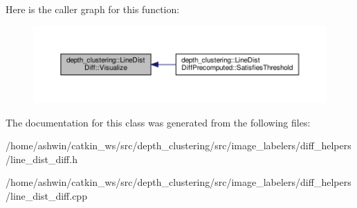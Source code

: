 Here is the caller graph for this function\+:\nopagebreak
\begin{figure}[H]
\begin{center}
\leavevmode
\includegraphics[width=350pt]{classdepth__clustering_1_1LineDistDiff_a7feaf820589ccfb47786d5124a74d725_icgraph}
\end{center}
\end{figure}


The documentation for this class was generated from the following files\+:\begin{DoxyCompactItemize}
\item 
/home/ashwin/catkin\+\_\+ws/src/depth\+\_\+clustering/src/image\+\_\+labelers/diff\+\_\+helpers/line\+\_\+dist\+\_\+diff.\+h\item 
/home/ashwin/catkin\+\_\+ws/src/depth\+\_\+clustering/src/image\+\_\+labelers/diff\+\_\+helpers/line\+\_\+dist\+\_\+diff.\+cpp\end{DoxyCompactItemize}
